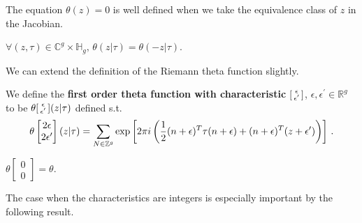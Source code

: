 \documentclass{article}
\begin{document}
\begin{corollary}
	The equation $\theta(z)=0$ is well defined when we take the equivalence class of $z$ in the Jacobian. 
\end{corollary}

\begin{prop}
	$\forall (z,\tau) \in \mathbb{C}^g \times \mathbb{H}_g, \, \theta(z|\tau) = \theta(-z | \tau)$. 
\end{prop}

We can extend the definition of the Riemann theta function slightly. 

\begin{definition}
We define the \textbf{first order theta function with characteristic} $\begin{bsmallmatrix} \epsilon \\ \epsilon^\prime \end{bsmallmatrix}$, $\epsilon, \epsilon^\prime \in \mathbb{R}^g$ to be $\theta\begin{bsmallmatrix} \epsilon \\ \epsilon^\prime \end{bsmallmatrix}(z | \tau)$ defined s.t. 
\[
	\theta\begin{bmatrix} 2\epsilon \\ 2\epsilon^\prime \end{bmatrix}(z|\tau) = \sum_{N \in \mathbb{Z}^g} \exp \left[ 2\pi i \left( \frac{1}{2} (n+\epsilon)^T \tau (n+\epsilon) + (n+\epsilon)^T(z+\epsilon^\prime) \right) \right] \, .
\]
\end{definition}
\begin{example}
	$\theta \begin{bmatrix} 0 \\ 0 \end{bmatrix} = \theta$. 
\end{example}
The case when the characteristics are integers is especially important by the following result. 
\end{document}
